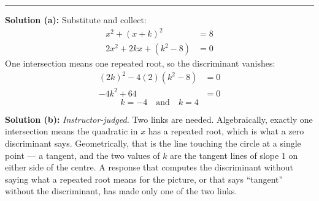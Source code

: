 \documentclass[12pt]{article}
\begin{document}
\vspace{0.1cm}\noindent\rule{\linewidth}{0.2pt}


\textbf{Solution (a):} Substitute and collect:
\begin{align*}
  x^{2} + (x + k)^{2} &= 8 \\
  2x^{2} + 2kx + \left(k^{2} - 8\right) &= 0
\end{align*}
One intersection means one repeated root, so the discriminant vanishes:
\begin{align*}
  (2k)^{2} - 4(2)\left(k^{2} - 8\right) &= 0 \\
  -4k^{2} + 64 &= 0
\end{align*}
\[ \boxed{k = -4 \quad \text{and} \quad k = 4} \]

\textbf{Solution (b):} \emph{Instructor-judged.} Two links are needed. Algebraically, exactly one intersection means the quadratic in $x$ has a repeated root, which is what a zero discriminant says. Geometrically, that is the line touching the circle at a single point --- a tangent, and the two values of $k$ are the tangent lines of slope $1$ on either side of the centre. A response that computes the discriminant without saying what a repeated root means for the picture, or that says ``tangent'' without the discriminant, has made only one of the two links.
\end{document}
